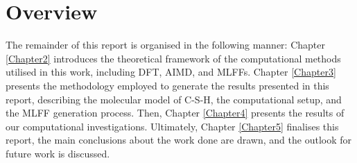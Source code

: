 \section{Overview}
The remainder of this report is organised in the following manner: Chapter \ref{Chapter2} introduces the theoretical framework of the computational methods utilised in this work, including DFT, AIMD, and MLFFs. Chapter \ref{Chapter3} presents the methodology employed to generate the results presented in this report, describing the molecular model of C-S-H, the computational setup, and the MLFF generation process. Then, Chapter \ref{Chapter4} presents the results of our computational investigations. Ultimately, Chapter \ref{Chapter5} finalises this report, the main conclusions about the work done are drawn, and the outlook for future work is discussed.
